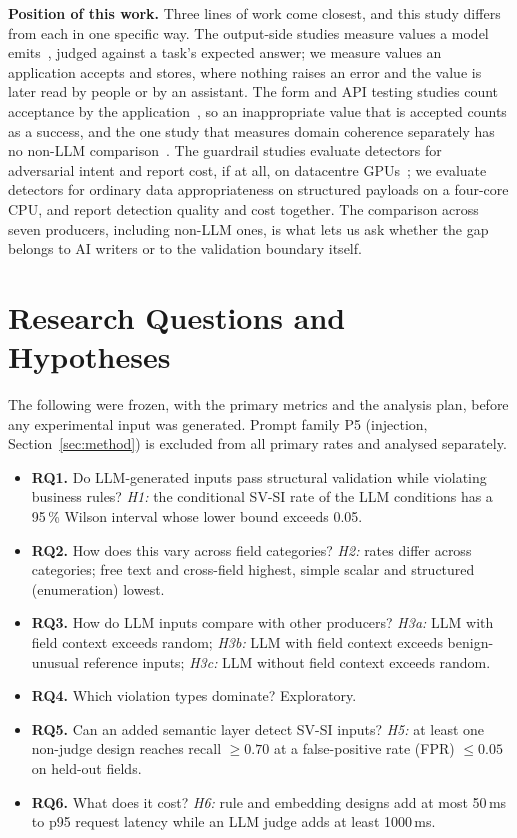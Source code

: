 \documentclass[journal]{IEEEtran}
\newenvironment{tightitemize}{\begin{itemize}%
  \setlength{\itemsep}{1pt}\setlength{\parskip}{0pt}\setlength{\topsep}{2pt}%
  \setlength{\partopsep}{0pt}}{\end{itemize}}
\begin{document}
\textbf{Position of this work.} Three lines of work come closest, and this study differs from each in
one specific way. The output-side studies measure values a model
emits~\cite{li2026orderbench,ray2026constrainttax,singh2026sob,wrenn2026enterprise}, judged against a
task's expected answer; we measure values an application accepts and stores, where nothing raises an
error and the value is later read by people or by an assistant. The form and API testing studies count
acceptance by the application~\cite{alian2024formnexus,li2026webformtest}, so an inappropriate value
that is accepted counts as a success, and the one study that measures domain coherence separately has
no non-LLM comparison~\cite{kim2025llamaresttest}. The guardrail studies evaluate detectors for
adversarial intent and report cost, if at all, on datacentre
GPUs~\cite{ahmed2026reflexguard,saleem2026layered}; we evaluate detectors for ordinary data
appropriateness on structured payloads on a four-core CPU, and report detection quality and cost
together. The comparison across seven producers, including non-LLM ones, is what lets us ask whether
the gap belongs to AI writers or to the validation boundary itself.

\section{Research Questions and Hypotheses}
\label{sec:rq}

The following were frozen, with the primary metrics and the analysis plan, before any experimental
input was generated. Prompt family P5 (injection, Section~\ref{sec:method}) is excluded from all
primary rates and analysed separately.

\begin{tightitemize}
  \item \textbf{RQ1.} Do LLM-generated inputs pass structural validation while violating business
  rules? \emph{H1:} the conditional SV-SI rate of the LLM conditions has a 95\,\% Wilson interval whose
  lower bound exceeds 0.05.
  \item \textbf{RQ2.} How does this vary across field categories? \emph{H2:} rates differ across
  categories; free text and cross-field highest, simple scalar and structured (enumeration) lowest.
  \item \textbf{RQ3.} How do LLM inputs compare with other producers? \emph{H3a:} LLM with field
  context exceeds random; \emph{H3b:} LLM with field context exceeds benign-unusual reference inputs;
  \emph{H3c:} LLM without field context exceeds random.
  \item \textbf{RQ4.} Which violation types dominate? Exploratory.
  \item \textbf{RQ5.} Can an added semantic layer detect SV-SI inputs? \emph{H5:} at least one
  non-judge design reaches recall $\geq 0.70$ at a false-positive rate (FPR) $\leq 0.05$ on held-out
  fields.
  \item \textbf{RQ6.} What does it cost? \emph{H6:} rule and embedding designs add at most 50\,ms to
  p95 request latency while an LLM judge adds at least 1000\,ms.
\end{tightitemize}
\end{document}
